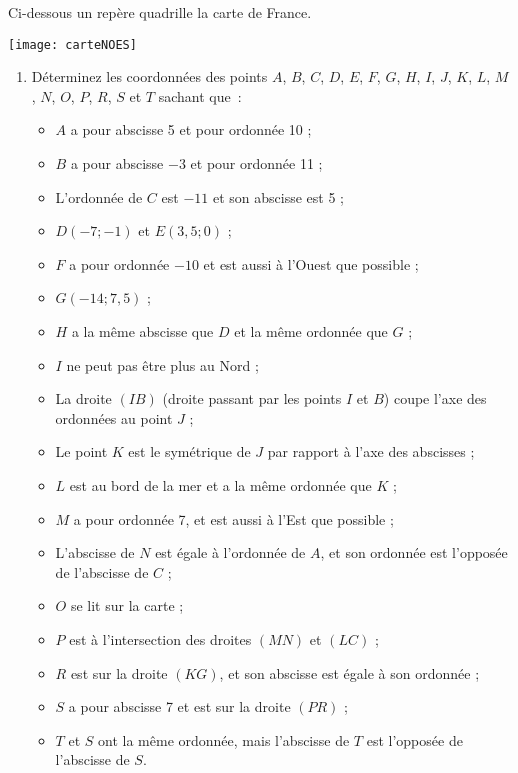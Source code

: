 
\begin{TP}

Ci-dessous un repère quadrille la carte de France.

\begin{center} \texttt{[image: carteNOES]} \end{center}

\begin{enumerate}
 \item Déterminez les coordonnées des points $A$, $B$, $C$, $D$, $E$, $F$, $G$, $H$, $I$, $J$, $K$, $L$, $M$, $N$, $O$, $P$, $R$, $S$ et $T$ sachant que :
 \begin{itemize}
  \item $A$ a pour abscisse 5 et pour ordonnée 10 ;
  \item $B$ a pour abscisse $- 3$ et pour ordonnée 11 ;
  \item L'ordonnée de $C$ est $- 11$ et son abscisse est 5 ;
  \item $D(- 7 ; - 1)$ et $E(3,5 ; 0)$ ;
  \item $F$ a pour ordonnée $- 10$ et est aussi à l'Ouest que possible ;
  \item $G(- 14 ; 7,5)$ ;
  \item $H$ a la même abscisse que $D$ et la même ordonnée que $G$ ;
  \item $I$ ne peut pas être plus au Nord ;
  \item La droite $(IB)$ (droite passant par les points $I$ et $B$) coupe l'axe des ordonnées au point $J$ ;
  \item Le point $K$ est le symétrique de $J$ par rapport à l'axe des abscisses ;
  \item $L$ est au bord de la mer et a la même ordonnée que $K$ ;
  \item $M$ a pour ordonnée 7, et est aussi à l'Est que possible ;
  \item L'abscisse de $N$ est égale à l'ordonnée de $A$, et son ordonnée est l'opposée de l'abscisse de $C$ ;
  \item $O$ se lit sur la carte ;
  \item $P$ est à l'intersection des droites $(MN)$ et $(LC)$ ;
  \item $R$ est sur la droite $(KG)$, et son abscisse est égale à son ordonnée ;
  \item $S$ a pour abscisse 7 et est sur la droite $(PR)$ ;
  \item $T$ et $S$ ont la même ordonnée, mais l'abscisse de $T$ est l'opposée de l'abscisse de $S$.

\end{itemize}
\end{enumerate}
\end{TP}
